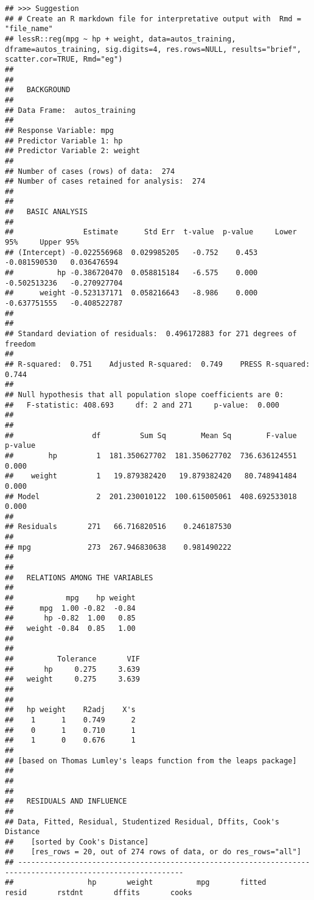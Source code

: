 \documentclass[]{article}
\begin{document}
\begin{verbatim}
## >>> Suggestion
## # Create an R markdown file for interpretative output with  Rmd = "file_name"
## lessR::reg(mpg ~ hp + weight, data=autos_training, dframe=autos_training, sig.digits=4, res.rows=NULL, results="brief", scatter.cor=TRUE, Rmd="eg")  
## 
## 
##   BACKGROUND
## 
## Data Frame:  autos_training 
##  
## Response Variable: mpg 
## Predictor Variable 1: hp 
## Predictor Variable 2: weight 
##  
## Number of cases (rows) of data:  274 
## Number of cases retained for analysis:  274 
## 
## 
##   BASIC ANALYSIS
## 
##                Estimate      Std Err  t-value  p-value     Lower 95%     Upper 95% 
## (Intercept) -0.022556968  0.029985205   -0.752    0.453   -0.081590530   0.036476594 
##          hp -0.386720470  0.058815184   -6.575    0.000   -0.502513236   -0.270927704 
##      weight -0.523137171  0.058216643   -8.986    0.000   -0.637751555   -0.408522787 
## 
## 
## Standard deviation of residuals:  0.496172883 for 271 degrees of freedom 
##  
## R-squared:  0.751    Adjusted R-squared:  0.749    PRESS R-squared:  0.744 
## 
## Null hypothesis that all population slope coefficients are 0:
##   F-statistic: 408.693     df: 2 and 271     p-value:  0.000 
## 
## 
##                  df         Sum Sq        Mean Sq        F-value   p-value 
##        hp         1  181.350627702  181.350627702  736.636124551     0.000 
##    weight         1   19.879382420   19.879382420   80.748941484     0.000 
## Model             2  201.230010122  100.615005061  408.692533018     0.000 
##  
## Residuals       271   66.716820516    0.246187530 
##  
## mpg             273  267.946830638    0.981490222 
## 
## 
##   RELATIONS AMONG THE VARIABLES
## 
##            mpg    hp weight 
##      mpg  1.00 -0.82  -0.84 
##       hp -0.82  1.00   0.85 
##   weight -0.84  0.85   1.00 
## 
## 
##          Tolerance       VIF 
##       hp     0.275     3.639 
##   weight     0.275     3.639 
## 
## 
##   hp weight    R2adj    X's 
##    1      1    0.749      2 
##    0      1    0.710      1 
##    1      0    0.676      1 
##  
## [based on Thomas Lumley's leaps function from the leaps package] 
##  
## 
## 
##   RESIDUALS AND INFLUENCE
## 
## Data, Fitted, Residual, Studentized Residual, Dffits, Cook's Distance 
##    [sorted by Cook's Distance] 
##    [res_rows = 20, out of 274 rows of data, or do res_rows="all"] 
## ------------------------------------------------------------------------------------------------------------ 
##                 hp       weight          mpg       fitted        resid       rstdnt       dffits       cooks 

\end{verbatim}
\end{document}
